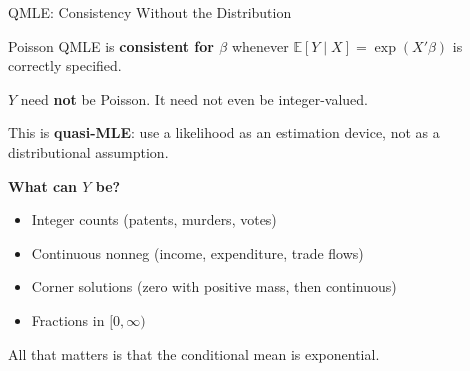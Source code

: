 \documentclass[aspectratio=169]{beamer}
\numberwithin{equation}{section}
\begin{document}

\begin{frame}{QMLE: Consistency Without the Distribution}

\begin{tcolorbox}[colback=blue!5, colframe=blue!50, title=Key Result (Gourieroux et al.~1984; Wooldridge 2010{,} 2023)]
Poisson QMLE is \textbf{consistent for $\beta$} whenever $\mathbb{E}[Y \mid X] = \exp(X'\beta)$ is correctly specified.

\medskip

$Y$ need \textbf{not} be Poisson. It need not even be integer-valued.
\end{tcolorbox}

\pause

\bigskip

This is \textbf{quasi-MLE}: use a likelihood as an estimation device, not as a distributional assumption.

\pause

\bigskip

\textbf{What can $Y$ be?}
\begin{itemize}
    \item Integer counts (patents, murders, votes)
    \item Continuous nonneg (income, expenditure, trade flows)
    \item Corner solutions (zero with positive mass, then continuous)
    \item Fractions in $[0,\infty)$
\end{itemize}

\pause

All that matters is that the conditional mean is exponential.

\end{frame}

\end{document}
